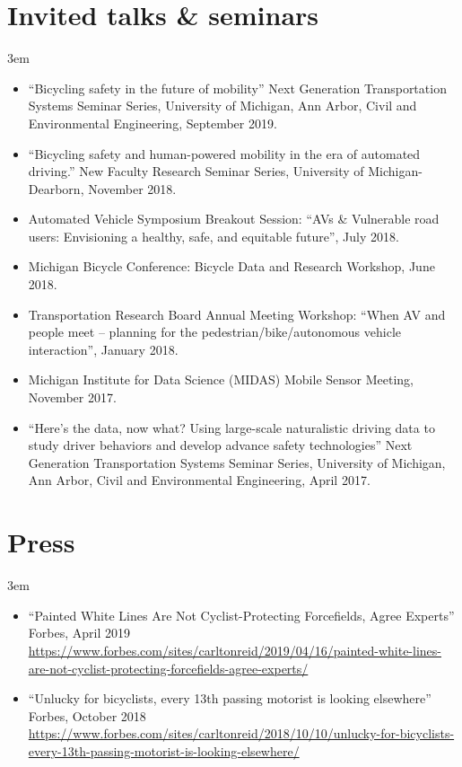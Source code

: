 \documentclass[11pt]{article}
\newenvironment{main}
{\begin{adjustwidth}{3em}{}}
{\end{adjustwidth}}
\begin{document}
\section*{Invited talks \& seminars}
\begin{main}

\begin{itemize}
    \item “Bicycling safety in the future of mobility” Next Generation Transportation Systems Seminar Series, University of Michigan, Ann Arbor, Civil and Environmental Engineering, September 2019.

    \item “Bicycling safety and human-powered mobility in the era of automated driving.” New Faculty Research Seminar Series, University of Michigan-Dearborn, November 2018.

    \item Automated Vehicle Symposium Breakout Session: “AVs \& Vulnerable road users: Envisioning a healthy, safe, and equitable future”, July 2018.

    \item Michigan Bicycle Conference: Bicycle Data and Research Workshop, June 2018.

    \item Transportation Research Board Annual Meeting Workshop: “When AV and people meet – planning for the pedestrian/bike/autonomous vehicle interaction”, January 2018.

    \item Michigan Institute for Data Science (MIDAS) Mobile Sensor Meeting, November 2017.

    \item “Here's the data, now what? Using large-scale naturalistic driving data to study driver behaviors and develop advance safety technologies” Next Generation Transportation Systems Seminar Series, University of Michigan, Ann Arbor, Civil and Environmental Engineering, April 2017. 

\end{itemize}


\end{main}
\section*{Press}
\begin{main}

\begin{itemize}
    \item “Painted White Lines Are Not Cyclist-Protecting Forcefields, Agree Experts” Forbes, April 2019 \\
        \url{https://www.forbes.com/sites/carltonreid/2019/04/16/painted-white-lines-are-not-cyclist-protecting-forcefields-agree-experts/}

    \item “Unlucky for bicyclists, every 13th passing motorist is looking elsewhere” Forbes, October 2018 \\
        \url{https://www.forbes.com/sites/carltonreid/2018/10/10/unlucky-for-bicyclists-every-13th-passing-motorist-is-looking-elsewhere/}
\end{itemize}


\end{main}
\end{document}
